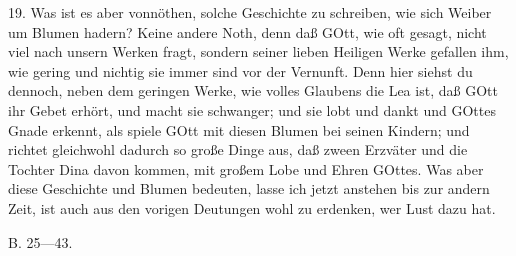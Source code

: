 19. Was ist es aber vonnöthen, solche Geschichte zu schreiben, wie sich Weiber um Blumen hadern? Keine andere Noth, denn daß GOtt, wie oft gesagt, nicht viel nach unsern Werken fragt, sondern seiner lieben Heiligen Werke gefallen ihm, wie gering und nichtig sie immer sind vor der Vernunft. Denn hier siehst du dennoch, neben dem geringen Werke, wie volles Glaubens die Lea ist, daß GOtt ihr Gebet erhört, und macht sie schwanger; und sie lobt und dankt und GOttes Gnade erkennt, als spiele GOtt mit diesen Blumen bei seinen Kindern; und richtet gleichwohl dadurch so große Dinge aus, daß zween Erzväter und die Tochter Dina davon kommen, mit großem Lobe und Ehren GOttes. Was aber diese Geschichte und Blumen bedeuten, lasse ich jetzt anstehen bis zur andern Zeit, ist auch aus den vorigen Deutungen wohl zu erdenken, wer Lust dazu hat.

B. 25—43.

